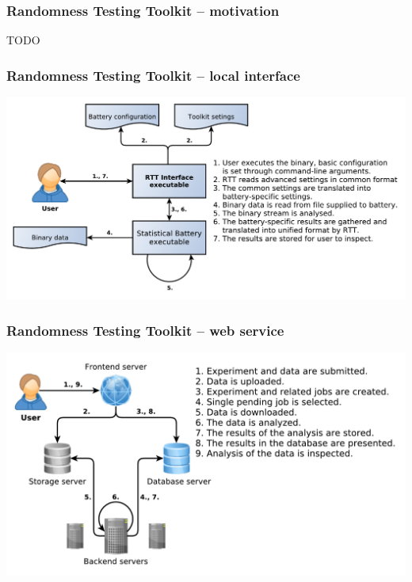 \documentclass[aspectratio=169]{beamer}
\begin{document}
\begin{frame}
\frametitle{Randomness Testing Toolkit -- motivation}
\begin{Huge}
TODO
\end{Huge}
\end{frame}

\begin{frame}
\frametitle{Randomness Testing Toolkit -- local interface}
\begin{nomar}
\centering
\includegraphics[width=\textwidth]{figures/local-rtt-workflow.pdf} 
\end{nomar}
\end{frame}

\begin{frame}
\frametitle{Randomness Testing Toolkit -- web service}
\begin{nomar}
\centering
\includegraphics[width=.9\textwidth]{figures/rtt-ecosystem.pdf} 
\end{nomar}
\end{frame}

\end{document}
